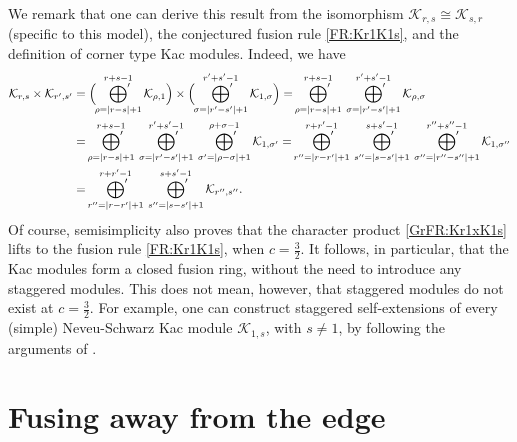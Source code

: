 \documentclass[a4paper,reqno,12pt]{report}
\theoremstyle{definition}
\numberwithin{equation}{section}
\let\originalleft\left     %
\let\originalright\right
\renewcommand{\left}{\mathopen{}\mathclose\bgroup\originalleft}
\renewcommand{\right}{\aftergroup\egroup\originalright}
\newcommand{\abs}[1]{\left\lvert #1 \right\rvert}
\newcommand{\Kac}[1]{\mathcal{K}_{#1}}       %
\newcommand{\fuse}{\mathbin{\times}}                                            %
\newcommand{\ns}{Neveu-Schwarz}
\theoremstyle{plain}
\begin{document}
We remark that one can derive this result from the isomorphism $\Kac{r,s}\cong\Kac{s,r}$ (specific to this model), the conjectured fusion rule \eqref{FR:Kr1K1s}, and the definition of corner type Kac modules.  Indeed, we have
\begin{align}
 \Kac{r,s}\fuse\Kac{r',s'}&=\Big(\sideset{}{'} \bigoplus_{\rho= \abs{r-s}+1}^{r+s-1}\Kac{\rho,1}\Big)
 \fuse\Big(\sideset{}{'} \bigoplus_{\sigma=\abs{r'-s'}+1}^{r'+s'-1}\Kac{1,\sigma}\Big)
=\sideset{}{'}\bigoplus_{\rho=\abs{r-s}+1}^{r+s-1}\ \sideset{}{'} \bigoplus_{\sigma=\abs{r'-s'}+1}^{r'+s'-1}\Kac{\rho,\sigma}
\nonumber\\
 &=\sideset{}{'}\bigoplus_{\rho=\abs{r-s}+1}^{r+s-1}\ \sideset{}{'} \bigoplus_{\sigma=\abs{r'-s'}+1}^{r'+s'-1}\
  \sideset{}{'}\bigoplus_{\sigma'=\abs{\rho-\sigma}+1}^{\rho+\sigma-1}\Kac{1,\sigma'}
 =\sideset{}{'} \bigoplus_{r'' = \abs{r-r'}+1}^{r+r'-1} \ \sideset{}{'} \bigoplus_{s'' = \abs{s-s'}+1}^{s+s'-1}\
 \sideset{}{'}\bigoplus_{\sigma''=\abs{r''-s''}+1}^{r''+s''-1}\Kac{1,\sigma''} \nonumber \\
 &= \sideset{}{'} \bigoplus_{r'' = \abs{r-r'}+1}^{r+r'-1} \ \sideset{}{'} \bigoplus_{s'' = \abs{s-s'}+1}^{s+s'-1} \Kac{r'',s''}.
\end{align}
Of course, semisimplicity also proves that the character product \eqref{GrFR:Kr1xK1s} lifts to the fusion rule \eqref{FR:Kr1K1s}, when $c=\frac{3}{2}$. It follows, in particular, that the Kac modules form a closed fusion ring, without the need to introduce any staggered modules.  This does not mean, however, that staggered modules do not exist at $c=\frac{3}{2}$.  For example, one can construct staggered self-extensions of every (simple) \ns{} Kac module $\Kac{1,s}$, with $s \neq 1$, by following the arguments of \cite[Prop~7.5]{RidSta09}.



\section{Fusing away from the edge} \label{sec:Away}
\end{document}
